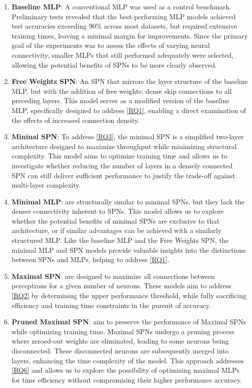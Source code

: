 \begin{enumerate}
\item \textbf{Baseline MLP}: A conventional MLP was used as a control benchmark. Preliminary tests revealed that the best-performing MLP models achieved test accuracies exceeding 90\% across most datasets, but required extensive training times, leaving a minimal margin for improvements. Since the primary goal of the experiments was to assess the effects of varying neural connectivity, smaller MLPs that still performed adequately were selected, allowing the potential benefits of SPNs to be more clearly observed.
\item \textbf{Free Weights SPN}: An SPN that mirrors the layer structure of the baseline MLP, but with the addition of free weights; dense skip connections to all preceding layers. This model serves as a modified version of the baseline MLP, specifically designed to address \ref{RQ1}, enabling a direct examination of the effects of increased connection density.
\item \textbf{Mininal SPN}: To address \ref{RQ3}, the minimal SPN is a simplified two-layer architecture designed to maximize throughput while minimizing structural complexity. This model aims to optimize training time and allows us to investigate whether reducing the number of layers in a densely connected SPN can still deliver sufficient performance to justify the trade-off against multi-layer complexity.
\item \textbf{Minimal MLP}: are structurally similar to minimal SPNs, but they lack the denser connectivity inherent to SPNs. This model allows us to explore whether the potential benefits of minimal SPNs are exclusive to that architecture, or if similar advantages can be achieved with a similarly structured MLP. Like the baseline MLP and the Free Weights SPN, the minimal MLP and SPN models provide valuable insights into the distinctions between SPNs and MLPs, helping to address \ref{RQ1}.
\item \textbf{Maximal SPN}: are designed to maximize all connections between perceptrons for a given number of neurons. These models aim to address \ref{RQ2} by determining the upper performance threshold, while fully sacrificing efficiency and training time constraints in the pursuit of accuracy.
\item \textbf{Pruned Maximal SPN}: aim to preserve the performance of Maximal SPNs while optimizing training time. Maximal SPNs undergo a pruning process where zeroed-out weights are eliminated, leading to some neurons being disconnected. These disconnected neurons are subsequently merged into layers, enhancing the time complexity of the model. This approach addresses \ref{RQ6} and allows us to explore the possibility of optimizing maximal MLPs for time efficiency without compromising their higher performance accuracy.
\end{enumerate}

